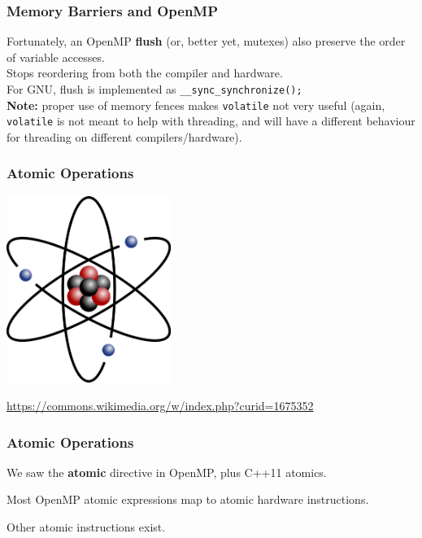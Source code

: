   
\begin{frame}
  \frametitle{Memory Barriers and OpenMP}

  
    Fortunately, an OpenMP {\bf flush} (or, better yet, mutexes) also preserve the order of variable accesses.\\[1em]
    Stops reordering from both the compiler and hardware.\\[1em]
    For GNU, flush is implemented as
      {\tt \_\_sync\_synchronize();}\\[1em]

  {\bf Note:} proper use of memory fences makes {\tt volatile} not very
  useful (again, {\tt volatile} is not meant to help with threading, and will
  have a different behaviour for threading on different compilers/hardware).
  
\end{frame}


\begin{frame}
\frametitle{Atomic Operations}

\begin{center}
	\includegraphics[width=0.4\textwidth]{images/atomic.png}
\end{center}

\url{https://commons.wikimedia.org/w/index.php?curid=1675352}

\end{frame}


\begin{frame}
  \frametitle{Atomic Operations}

  

 We saw the {\bf atomic} directive in OpenMP, plus C++11 atomics.

 Most OpenMP atomic expressions map to atomic hardware instructions.

 Other atomic instructions exist.
  

\end{frame}


